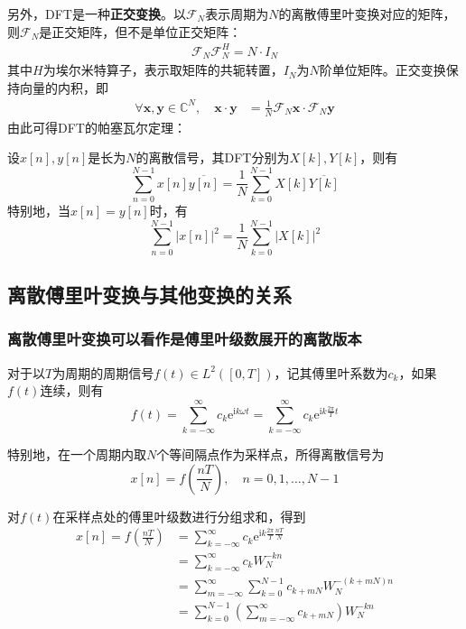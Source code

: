 另外，DFT是一种\textbf{正交变换}。以$\mathcal{F} _N$表示周期为$N$的离散傅里叶变换对应的矩阵，则$\mathcal{F} _N$是正交矩阵，但不是单位正交矩阵：
\begin{align*}
\mathcal{F}_N \mathcal{F}_N^H = N\cdot I_N
\end{align*}
其中$H$为埃尔米特算子，表示取矩阵的共轭转置，$I_N$为$N$阶单位矩阵。正交变换保持向量的内积，即
\begin{align*}
    \forall \mathbf{x,y}\in\mathbb{C}^N,\quad \mathbf{x}\cdot\mathbf{y}&=\frac{1}{N}\mathcal{F} _N \mathbf{x}\cdot\mathcal{F} _N \mathbf{y}
\end{align*}
由此可得DFT的帕塞瓦尔定理：
\begin{theorem}[离散傅里叶变换的帕塞瓦尔定理]
    设$x[n],y[n]$是长为$N$的离散信号，其DFT分别为$X[k],Y[k]$，则有
    \[\sum_{n=0}^{N-1}x[n]\overline{y[n]}=\frac{1}{N}\sum_{k=0}^{N-1}X[k]\overline{Y[k]}\]
    特别地，当$x[n]=y[n]$时，有
    \[\sum_{n=0}^{N-1}|x[n]|^2=\frac{1}{N}\sum_{k=0}^{N-1}|X[k]|^2\]
\end{theorem}

\subsection{离散傅里叶变换与其他变换的关系}\label{sub:relation_of_dft}

\subsubsection{离散傅里叶变换可以看作是傅里叶级数展开的离散版本}

对于以$T$为周期的周期信号$f(t)\in L^2([0,T])$，记其傅里叶系数为$c_k$，如果$f(t)$连续，则有
\[f(t)=\sum_{k=-\infty}^{\infty}c_k \mathrm{e}^{\mathrm{i}k\omega t}=\sum_{k=-\infty}^{\infty}c_k \mathrm{e}^{\mathrm{i}k\frac{2\pi}{T}t}\]

特别地，在一个周期内取$N$个等间隔点作为采样点，所得离散信号为
\[x[n]=f\left(\frac{nT}{N}\right),\quad n=0,1,\dots,N-1\]

对$f(t)$在采样点处的傅里叶级数进行分组求和，得到
\begin{align*}
    x[n]=f\left(\frac{nT}{N}\right)&=\sum_{k=-\infty}^{\infty}c_k \mathrm{e}^{\mathrm{i}k\frac{2\pi}{T}\frac{nT}{N}}\\
    &=\sum_{k=-\infty}^{\infty}c_k W_N^{-kn}\\
    &=\sum_{m=-\infty}^{\infty}\sum_{k=0}^{N-1}c_{k+mN} W_N^{-(k+mN)n}\\
    &=\sum_{k=0}^{N-1}\left(\sum_{m=-\infty}^{\infty}c_{k+mN}\right)W_N^{-kn}
\end{align*}

